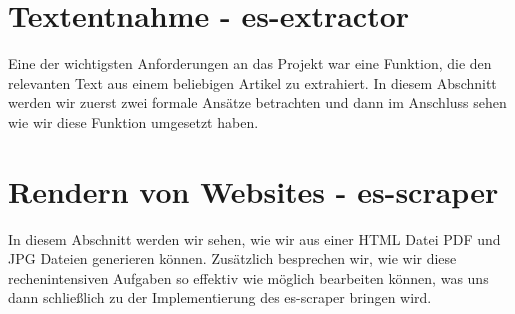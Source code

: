 

\chapter{Textentnahme - es-extractor}

Eine der wichtigsten Anforderungen an das Projekt war eine Funktion, die den relevanten Text aus einem beliebigen Artikel zu extrahiert. In diesem Abschnitt werden wir zuerst zwei formale Ansätze betrachten und dann im Anschluss sehen wie wir diese Funktion umgesetzt haben.





\chapter{Rendern von Websites - es-scraper}

In diesem Abschnitt werden wir sehen, wie wir aus einer HTML Datei PDF und JPG Dateien generieren können. Zusätzlich besprechen wir, wie wir diese rechenintensiven Aufgaben so effektiv wie möglich bearbeiten können, was uns dann schließlich zu der Implementierung des es-scraper bringen wird. 





